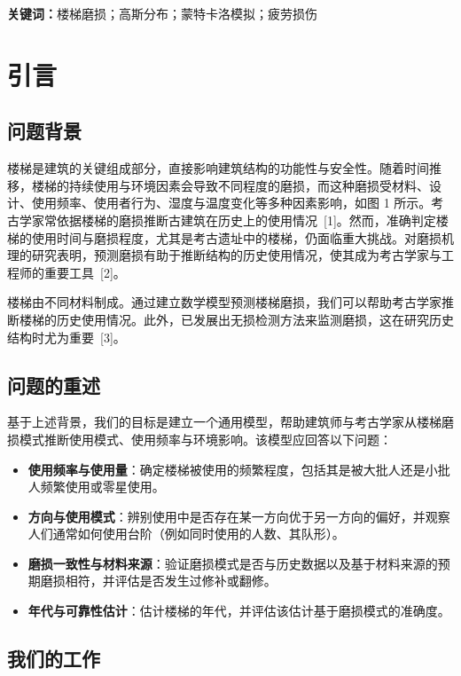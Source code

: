 \documentclass[11pt,a4paper]{ctexart}
\begin{document}
\vspace{0.6em}
\noindent\textbf{关键词：}楼梯磨损；高斯分布；蒙特卡洛模拟；疲劳损伤

\newpage

\section{引言}

\subsection{问题背景}

楼梯是建筑的关键组成部分，直接影响建筑结构的功能性与安全性。随着时间推移，楼梯的持续使用与环境因素会导致不同程度的磨损，而这种磨损受材料、设计、使用频率、使用者行为、湿度与温度变化等多种因素影响，如图 1 所示。考古学家常依据楼梯的磨损推断古建筑在历史上的使用情况~[1]。然而，准确判定楼梯的使用时间与磨损程度，尤其是考古遗址中的楼梯，仍面临重大挑战。对磨损机理的研究表明，预测磨损有助于推断结构的历史使用情况，使其成为考古学家与工程师的重要工具~[2]。

楼梯由不同材料制成。通过建立数学模型预测楼梯磨损，我们可以帮助考古学家推断楼梯的历史使用情况。此外，已发展出无损检测方法来监测磨损，这在研究历史结构时尤为重要~[3]。

\subsection{问题的重述}

基于上述背景，我们的目标是建立一个通用模型，帮助建筑师与考古学家从楼梯磨损模式推断使用模式、使用频率与环境影响。该模型应回答以下问题：

\begin{itemize}
\item \textbf{使用频率与使用量}：确定楼梯被使用的频繁程度，包括其是被大批人还是小批人频繁使用或零星使用。
\item \textbf{方向与使用模式}：辨别使用中是否存在某一方向优于另一方向的偏好，并观察人们通常如何使用台阶（例如同时使用的人数、其队形）。
\item \textbf{磨损一致性与材料来源}：验证磨损模式是否与历史数据以及基于材料来源的预期磨损相符，并评估是否发生过修补或翻修。
\item \textbf{年代与可靠性估计}：估计楼梯的年代，并评估该估计基于磨损模式的准确度。
\end{itemize}

\subsection{我们的工作}
\end{document}
